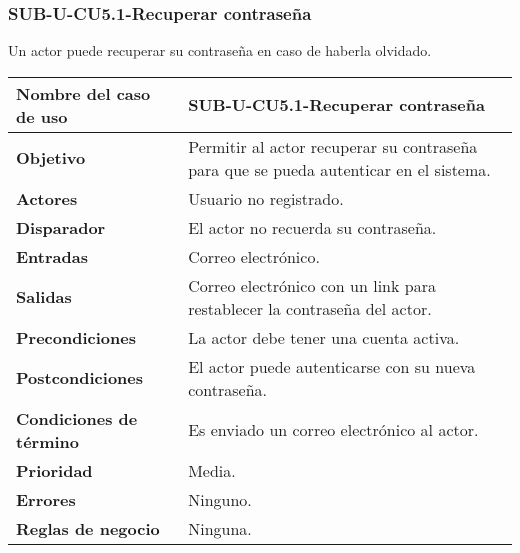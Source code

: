 \subsubsection{SUB-U-CU5.1-Recuperar contraseña}\label{SUB-U-CU5.1}
Un actor puede recuperar su contraseña en caso de haberla olvidado.

\begin{longtable}{|J{5cm}|J{10.3cm}|}
	\hline
	\textbf{Nombre del caso de uso} &
		SUB-U-CU5.1-Recuperar contraseña \\ \hline
	\textbf{Objetivo} &
		Permitir al actor recuperar su contraseña para que se pueda autenticar en el sistema. \\ \hline
	\textbf{Actores} &
		Usuario no registrado. \\ \hline 
	\textbf{Disparador} & 
		El actor no recuerda su contraseña. \\ \hline 
	\textbf{Entradas} & Correo electrónico.
		\\ \hline 
	\textbf{Salidas} & Correo electrónico con un link para restablecer la contraseña del actor.
		\\ \hline
	\textbf{Precondiciones} &
		La actor debe tener una cuenta activa.\\ \hline
	\textbf{Postcondiciones} & El actor puede autenticarse con su nueva contraseña.
		\\ \hline
	\textbf{Condiciones de término} & Es enviado un correo electrónico al actor.
		\\ \hline 
	\textbf{Prioridad} & 
		Media. \\ \hline
	\textbf{Errores} & Ninguno.
		\\ \hline
	\textbf{Reglas de negocio} & Ninguna.
		 \\ \hline
\end{longtable}

